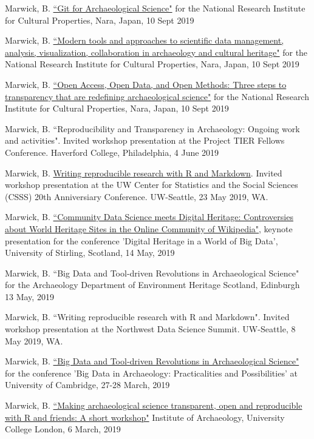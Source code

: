 \ind Marwick, B. \href{https://osf.io/dwks9/}{``Git for Archaeological Science"} for the National Research Institute for Cultural Properties, Nara, Japan, 10 Sept 2019 

\ind Marwick, B. \href{https://osf.io/ubvcp/}{``Modern tools and approaches to scientific data management, analysis, visualization, collaboration in archaeology and cultural heritage"} for the National Research Institute for Cultural Properties, Nara, Japan, 10 Sept 2019  

\ind Marwick, B.  \href{https://osf.io/4a6cw/}{``Open Access, Open Data, and Open Methods: Three steps to transparency that are redefining archaeological science"} for the National Research Institute for Cultural Properties, Nara, Japan, 10 Sept 2019 

\ind Marwick, B.  ``Reproducibility and Transparency in Archaeology: Ongoing work and activities". Invited workshop presentation at the Project TIER Fellows Conference. Haverford College, Philadelphia, 4 June 2019

\ind Marwick, B. \href{https://github.com/benmarwick/Marwick-CSSS-May-2019-Reproducibility }{Writing reproducible research with R and Markdown}. Invited workshop presentation at the UW Center for Statistics and the Social Sciences (CSSS) 20th Anniversiary Conference. UW-Seattle, 23 May 2019, WA. 

\ind Marwick, B. \href{https://github.com/benmarwick/Stirling-May-2019-digital-heritage-big-data }{``Community Data Science meets Digital Heritage: Controversies about World Heritage Sites in the Online Community of Wikipedia"}, keynote presentation for the conference 'Digital Heritage in a World of Big Data', University of Stirling, Scotland, 14 May, 2019 

\ind Marwick, B. ``Big Data and Tool-driven Revolutions in Archaeological Science" for the Archaeology Department of Environment Heritage Scotland, Edinburgh 13 May, 2019 

\ind Marwick, B.  ``Writing reproducible research with R and Markdown". Invited workshop presentation at the Northwest Data Science Summit. UW-Seattle, 8 May 2019, WA.

\ind Marwick, B. \href{https://github.com/benmarwick/March-2019-Cambridge-Big-Data-Archaeology }{``Big Data and Tool-driven Revolutions in Archaeological Science"} for the conference 'Big Data in Archaeology: Practicalities and Possibilities' at University of Cambridge, 27-28 March, 2019 

\ind Marwick, B. \href{https://github.com/benmarwick/Marwick-UCL-March-2019-Reproducibility }{``Making archaeological science transparent, open and reproducible with R and friends: A short workshop"} Institute of Archaeology, University College London, 6 March, 2019 

